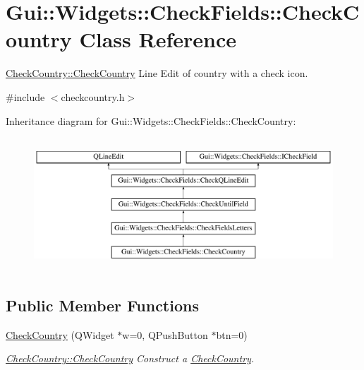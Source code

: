 \hypertarget{classGui_1_1Widgets_1_1CheckFields_1_1CheckCountry}{}\section{Gui\+:\+:Widgets\+:\+:Check\+Fields\+:\+:Check\+Country Class Reference}
\label{classGui_1_1Widgets_1_1CheckFields_1_1CheckCountry}


\hyperlink{classGui_1_1Widgets_1_1CheckFields_1_1CheckCountry_ae432c47f8bede68b29a89af24b234eef}{Check\+Country\+::\+Check\+Country} Line Edit of country with a check icon.  




{\ttfamily \#include $<$checkcountry.\+h$>$}

Inheritance diagram for Gui\+:\+:Widgets\+:\+:Check\+Fields\+:\+:Check\+Country\+:\begin{figure}[H]
\begin{center}
\leavevmode
\includegraphics[height=5.000000cm]{d0/d3f/classGui_1_1Widgets_1_1CheckFields_1_1CheckCountry}
\end{center}
\end{figure}
\subsection*{Public Member Functions}
\begin{DoxyCompactItemize}
\item 
\hyperlink{classGui_1_1Widgets_1_1CheckFields_1_1CheckCountry_ae432c47f8bede68b29a89af24b234eef}{Check\+Country} (Q\+Widget $\ast$w=0, Q\+Push\+Button $\ast$btn=0)
\begin{DoxyCompactList}\small\item\em \hyperlink{classGui_1_1Widgets_1_1CheckFields_1_1CheckCountry_ae432c47f8bede68b29a89af24b234eef}{Check\+Country\+::\+Check\+Country} Construct a \hyperlink{classGui_1_1Widgets_1_1CheckFields_1_1CheckCountry}{Check\+Country}. \end{DoxyCompactList}\end{DoxyCompactItemize}
